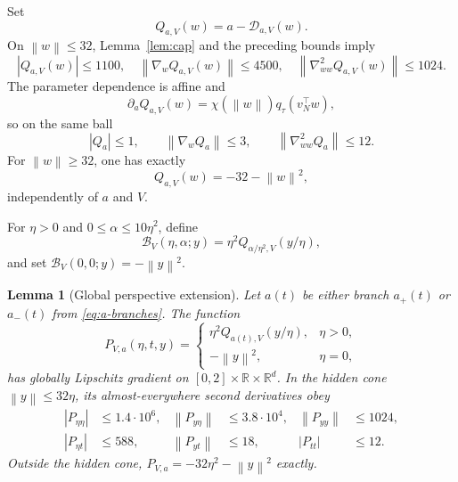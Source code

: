 \documentclass[11pt,a4paper]{article}
\newcommand{\R}{\mathbb R}
\newcommand{\norm}[1]{\left\lVert #1\right\rVert}
\newtheorem{lemma}[theorem]{Lemma}
\theoremstyle{definition}
\theoremstyle{remark}
\numberwithin{equation}{section}
\begin{document}
Set
\begin{equation}
 Q_{a,V}(w)=a-\mathscr D_{a,V}(w).
 \label{eq:Qdef}
\end{equation}
On $\norm w\le32$, Lemma~\ref{lem:cap} and the preceding bounds imply
\begin{equation}
 |Q_{a,V}(w)|\le1100,
 \quad \norm{\nabla_wQ_{a,V}(w)}\le4500,
 \quad \norm{\nabla^2_{ww}Q_{a,V}(w)}\le1024.
 \label{eq:Q-spatial-bounds}
\end{equation}
The parameter dependence is affine and
\begin{equation}
 \partial_aQ_{a,V}(w)
 =\chi(\norm w)q_\tau(v_N^\top w),
 \label{eq:Qa-formula}
\end{equation}
so on the same ball
\begin{equation}
 |Q_a|\le1,
 \qquad \norm{\nabla_wQ_a}\le3,
 \qquad \norm{\nabla^2_{ww}Q_a}\le12.
 \label{eq:Qa-bounds}
\end{equation}
For $\norm w\ge32$, one has exactly
\begin{equation}
 Q_{a,V}(w)=-32-\norm w^2,
 \label{eq:Q-tail}
\end{equation}
independently of $a$ and $V$.

For $\eta>0$ and $0\le\alpha\le10\eta^2$, define
\begin{equation}
 \mathscr B_V(\eta,\alpha;y)
 =\eta^2Q_{\alpha/\eta^2,V}(y/\eta),
 \label{eq:Bcap}
\end{equation}
and set $\mathscr B_V(0,0;y)=-\norm y^2$.

\begin{lemma}[Global perspective extension]
\label{lem:perspective-extension}
Let $a(t)$ be either branch $a_+(t)$ or $a_-(t)$ from \eqref{eq:a-branches}.  The function
\begin{equation}
 P_{V,a}(\eta,t,y)=
 \begin{cases}
 \eta^2Q_{a(t),V}(y/\eta),&\eta>0,\\
 -\norm y^2,&\eta=0,
 \end{cases}
 \label{eq:Pdef}
\end{equation}
has globally Lipschitz gradient on $[0,2]\times\R\times\R^d$.  In the hidden cone
$\norm y\le32\eta$, its almost-everywhere second derivatives obey
\begin{align}
 |P_{\eta\eta}|&\le1.4\cdot10^6,
 &\norm{P_{y\eta}}&\le3.8\cdot10^4,
 &\norm{P_{yy}}&\le1024,
 \label{eq:P-hess-1}\\
 |P_{\eta t}|&\le588,
 &\norm{P_{yt}}&\le18,
 &|P_{tt}|&\le12.
 \label{eq:P-hess-2}
\end{align}
Outside the hidden cone, $P_{V,a}=-32\eta^2-\norm y^2$ exactly.
\end{lemma}
\end{document}

